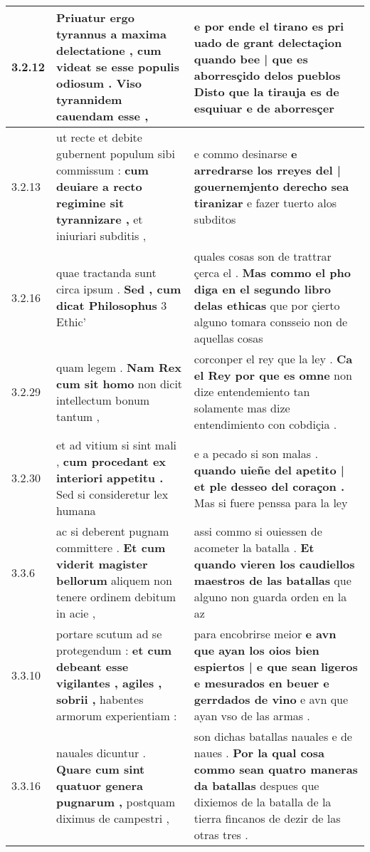 \begin{tabular}{|p{1cm}|p{6.5cm}|p{6.5cm}|}
3.2.12 & Priuatur ergo tyrannus a maxima delectatione , \textbf{ cum videat se esse populis odiosum . } Viso tyrannidem cauendam esse , & e por ende el tirano es pri uado de grant delectaçion \textbf{ quando bee | que es aborresçido delos pueblos } Disto que la tirauja es de esquiuar e de aborresçer \\\hline
3.2.13 & ut recte et debite gubernent populum sibi commissum : \textbf{ cum deuiare a recto regimine sit tyrannizare , } et iniuriari subditis , & e commo desinarse \textbf{ e arredrarse los rreyes del | gouernemjento derecho sea tiranizar } e fazer tuerto alos subditos \\\hline
3.2.16 & quae tractanda sunt circa ipsum . \textbf{ Sed , cum dicat Philosophus } 3 Ethic’ & quales cosas son de trattrar çerca el . \textbf{ Mas commo el pho diga en el segundo libro delas ethicas } que por çierto alguno tomara consseio non de aquellas cosas \\\hline
3.2.29 & quam legem . \textbf{ Nam Rex cum sit homo } non dicit intellectum bonum tantum , & corconper el rey que la ley . \textbf{ Ca el Rey por que es omne } non dize entendemiento tan solamente mas dize entendimiento con cobdiçia . \\\hline
3.2.30 & et ad vitium si sint mali , \textbf{ cum procedant ex interiori appetitu . } Sed si consideretur lex humana & e a pecado si son malas . \textbf{ quando uieñe del apetito | et ple desseo del coraçon . } Mas si fuere penssa para la ley \\\hline
3.3.6 & ac si deberent pugnam committere . \textbf{ Et cum viderit magister bellorum } aliquem non tenere ordinem debitum in acie , & assi commo si ouiessen de acometer la batalla . \textbf{ Et quando vieren los caudiellos maestros de las batallas } que alguno non guarda orden en la az \\\hline
3.3.10 & portare scutum ad se protegendum : \textbf{ et cum debeant esse vigilantes , agiles , sobrii , } habentes armorum experientiam : & para encobrirse meior \textbf{ e avn que ayan los oios bien espiertos | e que sean ligeros e mesurados en beuer e gerrdados de vino } e avn que ayan vso de las armas . \\\hline
3.3.16 & nauales dicuntur . \textbf{ Quare cum sint quatuor genera pugnarum , } postquam diximus de campestri , & son dichas batallas nauales e de naues . \textbf{ Por la qual cosa commo sean quatro maneras da batallas } despues que dixiemos de la batalla de la tierra fincanos de dezir de las otras tres . \\\hline

\end{tabular}
